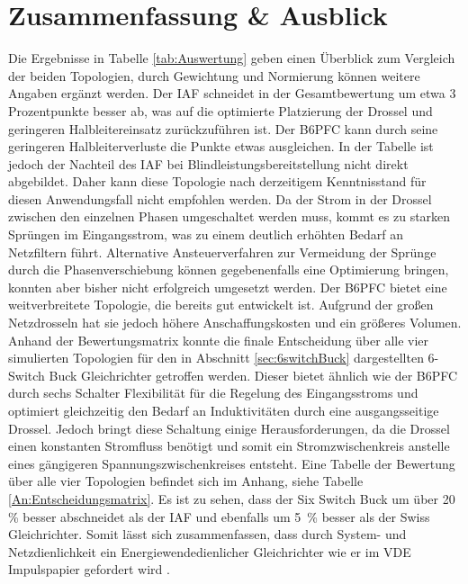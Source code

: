 \chapter{Zusammenfassung \& Ausblick}
Die Ergebnisse in Tabelle \ref{tab:Auswertung} geben einen Überblick zum Vergleich der beiden Topologien, durch Gewichtung und Normierung können weitere Angaben ergänzt werden. Der \gls{IAF} schneidet in der Gesamtbewertung um etwa 3 Prozentpunkte besser ab, was auf die optimierte Platzierung der Drossel und geringeren Halbleitereinsatz zurückzuführen ist. Der \gls{B6PFC} kann durch seine geringeren Halbleiterverluste die Punkte etwas ausgleichen. In der Tabelle ist jedoch der Nachteil des \gls{IAF} bei Blindleistungsbereitstellung nicht direkt abgebildet. Daher kann diese Topologie nach derzeitigem Kenntnisstand für diesen Anwendungsfall nicht empfohlen werden. Da der Strom in der Drossel zwischen den einzelnen Phasen umgeschaltet werden muss, kommt es zu starken Sprüngen im Eingangsstrom, was zu einem deutlich erhöhten Bedarf an Netzfiltern führt. Alternative Ansteuerverfahren zur Vermeidung der Sprünge durch die Phasenverschiebung können gegebenenfalls eine Optimierung bringen, konnten aber bisher nicht erfolgreich umgesetzt werden. Der \gls{B6PFC} bietet eine weitverbreitete Topologie, die bereits gut entwickelt ist. Aufgrund der großen Netzdrosseln hat sie jedoch höhere Anschaffungskosten und ein größeres Volumen. \\ 
Anhand der Bewertungsmatrix konnte die finale Entscheidung über alle vier simulierten Topologien für den in Abschnitt \ref{sec:6switchBuck} dargestellten 6-Switch Buck Gleichrichter getroffen werden. Dieser bietet ähnlich wie der \gls{B6PFC} durch sechs Schalter Flexibilität für die Regelung des Eingangsstroms und optimiert gleichzeitig den Bedarf an Induktivitäten durch eine ausgangsseitige Drossel. Jedoch bringt diese Schaltung einige Herausforderungen, da die Drossel einen konstanten Stromfluss benötigt und somit ein Stromzwischenkreis anstelle eines gängigeren Spannungszwischenkreises entsteht. Eine Tabelle der Bewertung über alle vier Topologien befindet sich im Anhang, siehe Tabelle \ref{An:Entscheidungsmatrix}. Es ist zu sehen, dass der Six Switch Buck um über 20 \% besser abschneidet als der \gls{IAF} und ebenfalls um 5~\% besser als der Swiss Gleichrichter. Somit lässt sich zusammenfassen, dass durch System- und Netzdienlichkeit ein Energiewendedienlicher Gleichrichter wie er im VDE Impulspapier gefordert wird \cite{VDEImpuls}.\\
